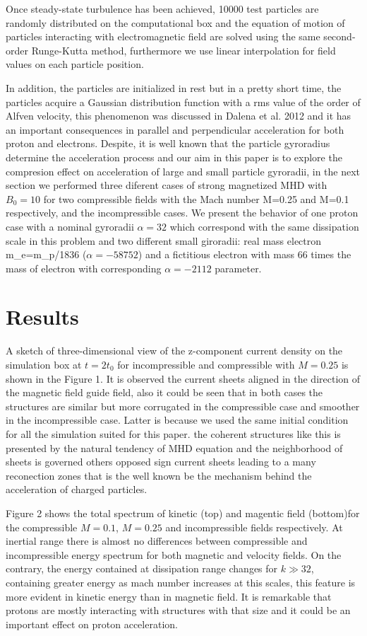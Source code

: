 \documentclass[11pt,twocolumn]{article}
\begin{document}
Once steady-state turbulence has been achieved, 10000 test particles are randomly distributed on the computational box and the equation of motion of particles interacting with electromagnetic field are solved using the same second-order Runge-Kutta method, furthermore we use linear interpolation for field values on each particle position.


In addition, the particles are initialized in rest but in a pretty short time, the particles acquire a Gaussian distribution function with a rms value of the order of Alfven velocity, this phenomenon was discussed in Dalena et al. 2012 and it has an important consequences in parallel and perpendicular acceleration for both proton and electrons. Despite, it is well known that the particle gyroradius determine the acceleration process and our aim in this paper is to explore the compresion effect on acceleration of large and small particle gyroradii, in the next section we performed three diferent cases of strong magnetized MHD with $B_0=10$ for two compressible fields with the Mach number M=0.25 and M=0.1 respectively, and the incompressible cases. We present the behavior of one proton case with a nominal gyroradii $\alpha= 32$ which correspond with the same dissipation scale in this problem and two different small giroradii: real mass electron m_e=m_p/1836 ($\alpha=-58752$) and a fictitious electron with mass 66 times the mass of electron with corresponding $\alpha=-2112$ parameter.

\section*{Results}

A sketch of three-dimensional view of the z-component current density on the simulation box at $t=2t_0$ for incompressible and compressible with $M=0.25$ is shown in the Figure 1. It is observed the current sheets aligned in the direction of the magnetic field guide field, also it could be seen that in both cases the structures are similar but more corrugated in the compressible case and smoother in the incompressible case. Latter is because we used the same initial condition for all the simulation suited for this paper. the coherent structures like this is presented by the natural tendency of MHD equation and the neighborhood of sheets is governed others opposed sign current sheets leading to a many reconection zones that is the well known be the mechanism behind the acceleration of charged particles.

Figure 2 shows the total spectrum of kinetic (top) and magentic field (bottom)for the compressible $M=0.1$, $M=0.25$ and incompressible fields respectively. At inertial range there is almost no differences between compressible and incompressible energy spectrum for both magnetic and velocity fields. On the contrary, the energy contained at dissipation range changes for $k\gg32$, containing greater energy as mach number increases at this scales, this feature is more evident in kinetic energy than in magnetic field. It is remarkable that protons are mostly interacting with structures with that size and it could be an important effect on proton acceleration.
\end{document}
